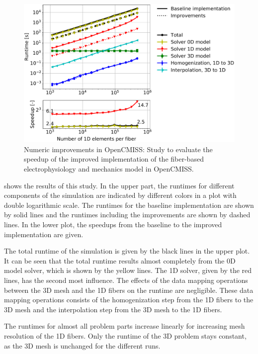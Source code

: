 \begin{figure}
  \centering%
  \includegraphics[width=\textwidth]{images/results/studies/opencmiss_cuboid_serial_scaling_comparison_aggressive.pdf}%
  \caption{Numeric improvements in OpenCMISS: Study to evaluate the speedup of the improved implementation of the fiber-based electrophysiology and mechanics model in OpenCMISS.}%
  \label{fig:opencmiss_improvements}%
\end{figure}%

 shows the results of this study. In the upper part, the runtimes for different components of the simulation are indicated by different colors in a plot with double logarithmic scale. The runtimes for the baseline implementation are shown by solid lines and the runtimes including the improvements are shown by dashed lines. In the lower plot, the speedups from the baseline to the improved implementation are given.

The total runtime of the simulation is given by the black lines in the upper plot. It can be seen that the total runtime results almost completely from the 0D model solver, which is shown by the yellow lines. The 1D solver, given by the red lines, has the second most influence. The effects of the data mapping operations between the 3D mesh and the 1D fibers on the runtime are negligible. These data mapping operations consists of the homogenization step from the 1D fibers to the 3D mesh and the interpolation step from the 3D mesh to the 1D fibers.

The runtimes for almost all problem parts increase linearly for increasing mesh resolution of the 1D fibers. Only the runtime of the 3D problem stays constant, as the 3D mesh is unchanged for the different runs.

